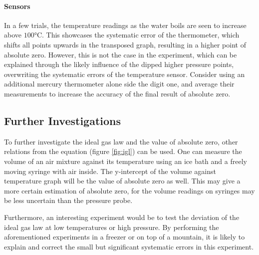 \documentclass[a4paper,12pt]{article}
\begin{document}
\paragraph{Sensors}
In a few trials, the temperature readings as the water boils are seen to increase above $100\si{\celsius}$. This showcases the systematic error of the thermometer, which shifts all points upwards in the transposed graph, resulting in a higher point of absolute zero. However, this is not the case in the experiment, which can be explained through the likely influence of the dipped higher pressure points, overwriting the systematic errors of the temperature sensor. Consider using an additional mercury thermometer alone side the digit one, and average their measurements to increase the accuracy of the final result of absolute zero.

\subsection{Further Investigations}
To further investigate the ideal gas law and the value of absolute zero, other relations from the equation (figure \ref{fig:igl}) can be used. One can measure the volume of an air mixture against its temperature using an ice bath and a freely moving syringe with air inside. The y-intercept of the volume against temperature graph will be the value of absolute zero as well. This may give a more certain estimation of absolute zero, for the volume readings on syringes may be less uncertain than the pressure probe.

Furthermore, an interesting experiment would be to test the deviation of the ideal gas law at low temperatures or high pressure. By performing the aforementioned experiments in a freezer or on top of a mountain, it is likely to explain and correct the small but significant systematic errors in this experiment.

\newpage
\nocite{*}
\printbibliography


\newpage
\end{document}
